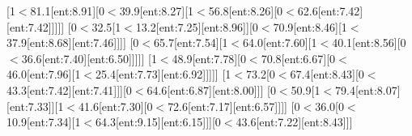 [1$<$81.1[ent:8.91][0$<$39.9[ent:8.27][1$<$56.8[ent:8.26][0$<$62.6[ent:7.42][ent:7.42]]]]]
[0$<$32.5[1$<$13.2[ent:7.25][ent:8.96]][0$<$70.9[ent:8.46][1$<$37.9[ent:8.68][ent:7.46]]]]
[0$<$65.7[ent:7.54][1$<$64.0[ent:7.60][1$<$40.1[ent:8.56][0$<$36.6[ent:7.40][ent:6.50]]]]]
[1$<$48.9[ent:7.78][0$<$70.8[ent:6.67][0$<$46.0[ent:7.96][1$<$25.4[ent:7.73][ent:6.92]]]]]
[1$<$73.2[0$<$67.4[ent:8.43][0$<$43.3[ent:7.42][ent:7.41]]][0$<$64.6[ent:6.87][ent:8.00]]]
[0$<$50.9[1$<$79.4[ent:8.07][ent:7.33]][1$<$41.6[ent:7.30][0$<$72.6[ent:7.17][ent:6.57]]]]
[0$<$36.0[0$<$10.9[ent:7.34][1$<$64.3[ent:9.15][ent:6.15]]][0$<$43.6[ent:7.22][ent:8.43]]]
